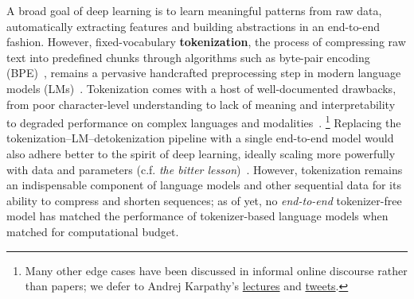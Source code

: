 \documentclass{article}
\newcommand{\citep}{\parencite}
\theoremstyle{plain}
\theoremstyle{remark}
\begin{document}
A broad goal of deep learning is to learn meaningful patterns from raw data, automatically extracting features and building abstractions in an end-to-end fashion.
However, fixed-vocabulary \textbf{tokenization}, the process of compressing raw text into predefined chunks through algorithms such as byte-pair encoding (BPE)~\citep{BPE,SentencePiece}, remains a pervasive handcrafted preprocessing step in modern language models (LMs)~\citep{Llama3, GPT3}.
Tokenization comes with a host of well-documented drawbacks,
from poor character-level understanding to lack of meaning and interpretability to degraded performance on complex languages and modalities~\citep{petrov2023language, ahia2023all, belinkov2017synthetic, Adv-BERT, ByT5, Canine}.
\footnote{Many other edge cases have been discussed in informal online discourse rather than papers; we defer to Andrej Karpathy's \href{https://x.com/karpathy/status/1657949234535211009}{lectures} and \href{https://x.com/karpathy/status/1759996551378940395}{tweets}.}
Replacing the tokenization--LM--detokenization pipeline with a single end-to-end model would also adhere better to the spirit of deep learning, ideally scaling more powerfully with data and parameters (c.f. \emph{the bitter lesson})~\citep{sutton2019bitter,peric2025bitter}.
However, tokenization remains an indispensable component of language models and other sequential data for its ability to compress and shorten sequences; as of yet, no \emph{end-to-end} tokenizer-free model has matched the performance of tokenizer-based language models when matched for computational budget.
\end{document}
